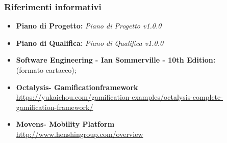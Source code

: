 \subsubsection {Riferimenti informativi}
\begin{itemize}
	\item \textbf{Piano di Progetto:} \textit{Piano di Progetto v1.0.0}
	\item \textbf{Piano di Qualifica:} \textit{Piano di Qualifica v1.0.0}
	\item \textbf{Software Engineering - Ian Sommerville - 10th Edition: \\}(formato cartaceo);
	\item \textbf{Octalysis\glosp - Gamification\glosp framework\glosp \\}
	\href{https://yukaichou.com/gamification-examples/octalysis-complete-gamification-framework/}{https://yukaichou.com/gamification-examples/octalysis-complete-gamification-framework/}
	\item \textbf{Movens\glosp - Mobility Platform \\}
	\href{http://www.henshingroup.com/overview/}{http://www.henshingroup.com/overview} 
\end{itemize}
